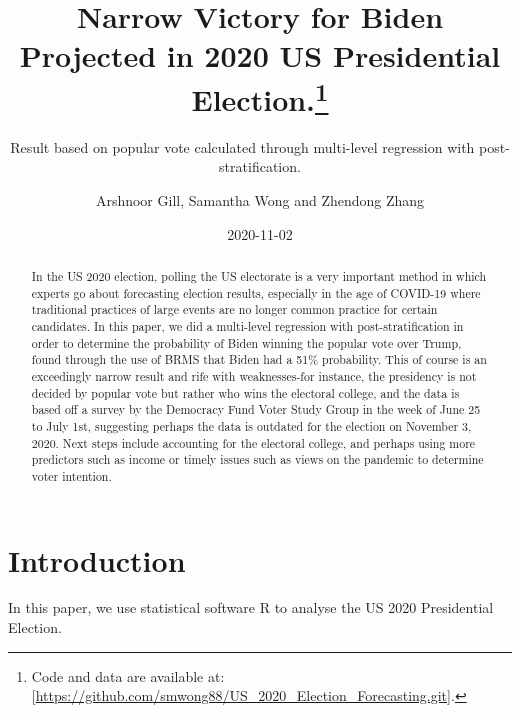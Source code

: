 \documentclass[
]{article}
\title{Narrow Victory for Biden Projected in 2020 US Presidential Election.\thanks{Code and data are available at: {[}\url{https://github.com/smwong88/US_2020_Election_Forecasting.git}{]}.}}
\subtitle{Result based on popular vote calculated through multi-level regression with post-stratification.}
\author{Arshnoor Gill, Samantha Wong and Zhendong Zhang}
\date{2020-11-02}
\begin{document}
\maketitle
\begin{abstract}
In the US 2020 election, polling the US electorate is a very important method in which experts go about forecasting election results, especially in the age of COVID-19 where traditional practices of large events are no longer common practice for certain candidates. In this paper, we did a multi-level regression with post-stratification in order to determine the probability of Biden winning the popular vote over Trump, found through the use of BRMS that Biden had a 51\% probability. This of course is an exceedingly narrow result and rife with weaknesses-for instance, the presidency is not decided by popular vote but rather who wins the electoral college, and the data is based off a survey by the Democracy Fund Voter Study Group in the week of June 25 to July 1st, suggesting perhaps the data is outdated for the election on November 3, 2020. Next steps include accounting for the electoral college, and perhaps using more predictors such as income or timely issues such as views on the pandemic to determine voter intention.
\end{abstract}

{
\setcounter{tocdepth}{2}
\tableofcontents
}
\hypertarget{introduction}{%
\section{Introduction}\label{introduction}}

In this paper, we use statistical software R \citep{citeR} to analyse the US 2020 Presidential Election.
\end{document}
